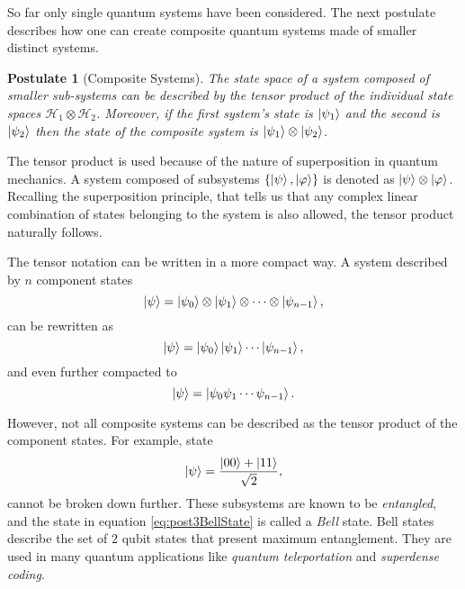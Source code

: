 \documentclass[../../../dissertation.tex]{subfiles}
\newtheorem{post}{Postulate}
\begin{document}
So far only single quantum systems have been considered. The next postulate
describes how one can create composite quantum systems made of smaller distinct
systems.
\begin{post}[Composite Systems]
	The state space of a system composed of smaller sub-systems can be
	described by the tensor product of the individual state spaces
	$\mathcal{H}_1\otimes\mathcal{H}_2$. Moreover, if the first system's
	state is $\ket{\psi_1}$ and the second is $\ket{\psi_2}$ then the state
	of the composite system is $\ket{\psi_1} \otimes \ket{\psi_2}$.  
\end{post}\par

The tensor product is used because of the nature of superposition in quantum
mechanics. A system composed of subsystems $\{\ket{\psi},\ket{\varphi}\}$ is denoted as $\ket{\psi}\otimes\ket{\varphi}$. Recalling the superposition principle,
that tells us that any complex linear combination of states belonging to the
system is also allowed, the tensor product naturally follows.\par
The tensor notation can be written in a more compact way. A system
described by $n$ component states \begin{equation}
	\ket{\psi} = \ket{\psi_0} \otimes \ket{\psi_1} \otimes \cdots \otimes \ket{\psi_{n-1}},
\end{equation}
can be rewritten as 
\begin{equation}
	\ket{\psi} = \ket{\psi_0}\ket{\psi_1} \cdots \ket{\psi_{n-1}},
\end{equation}
and even further compacted to
\begin{equation}
	\ket{\psi} = \ket{\psi_0 \psi_1 \cdots \psi_{n-1}}.
\end{equation}\par

However, not all composite systems can be described as the tensor product of
the component states. For example, state 
\begin{equation}
	\label{eq:post3BellState}
	\ket{\psi} = \frac{\ket{00} +\ket{11}}{\sqrt{2}}, 
\end{equation}
cannot be broken down further. These subsystems are known to be
\textit{entangled}, and the state in equation \eqref{eq:post3BellState} is called
a \textit{Bell} state. Bell states describe the set of $2$ qubit states that
present maximum entanglement. They are used in many quantum applications like
\textit{quantum teleportation} and \textit{superdense coding}.\par
\end{document}
